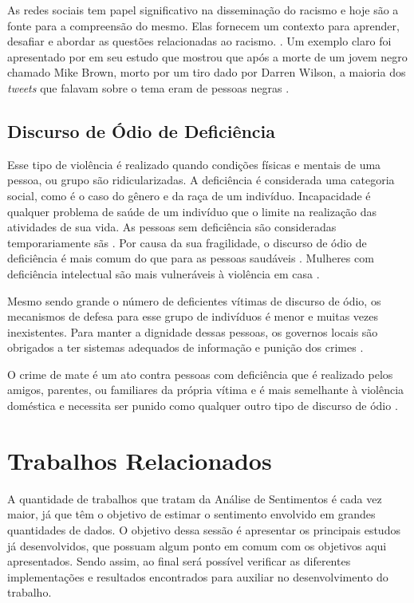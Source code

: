As redes sociais tem papel significativo na disseminação do racismo e hoje são a fonte para a compreensão do mesmo. Elas fornecem um contexto para aprender, desafiar e abordar as questões relacionadas ao racismo.  \cite{Chetty2018}. Um exemplo claro foi apresentado por  em seu estudo que mostrou que após a morte de um jovem negro  chamado Mike Brown, morto por um tiro dado por Darren Wilson, a maioria dos \textit{tweets} que falavam sobre o tema eram de pessoas negras \cite{Chaudhry2016}.

\subsection{Discurso de Ódio de Deficiência}

Esse tipo de violência é realizado quando condições físicas e mentais de uma pessoa, ou grupo são ridicularizadas. A deficiência é considerada uma categoria social, como é o caso do gênero e da raça de um indivíduo. Incapacidade é qualquer problema de saúde de um indivíduo que o limite na realização das atividades de sua vida. As pessoas sem deficiência são consideradas temporariamente sãs \cite{doi:10.1086/ahr/108.3.763}. Por causa da sua fragilidade, o discurso de ódio de deficiência é mais comum do que para as pessoas saudáveis \cite{Chetty2018}. Mulheres com deficiência intelectual são mais vulneráveis à violência em casa \cite{McCarthy2017}. 

Mesmo sendo grande o número de deficientes vítimas de discurso de ódio, os mecanismos de defesa para esse grupo de indivíduos é menor e muitas vezes inexistentes. Para manter a dignidade dessas pessoas, os governos locais são obrigados a ter sistemas adequados de informação e punição dos crimes \cite{Macdonald2017}.

O crime de mate é um ato contra pessoas com deficiência que é realizado pelos amigos, parentes, ou familiares da própria vítima e é mais semelhante à violência doméstica e necessita ser punido como qualquer outro tipo de discurso de ódio \cite{Chetty2018}. 

\section{Trabalhos Relacionados}
A quantidade de trabalhos que tratam da Análise de Sentimentos é cada vez maior, já que têm o objetivo de estimar o sentimento envolvido em grandes quantidades de dados. O objetivo dessa sessão é apresentar os principais estudos já desenvolvidos, que possuam algum ponto em comum com os objetivos aqui apresentados. Sendo assim, ao final será possível verificar as diferentes implementações e resultados encontrados para auxiliar no desenvolvimento do trabalho.

